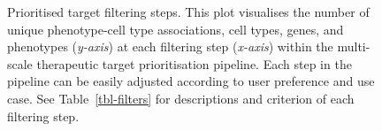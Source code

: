 \documentclass[
]{article}
\begin{document}
\newpage{}

\label{cell-fig-therapy-filter}
\begin{figure}[H]


\caption{\label{fig-therapy-filter}Prioritised target filtering steps.
This plot visualises the number of unique phenotype-cell type
associations, cell types, genes, and phenotypes (\emph{y-axis}) at each
filtering step (\emph{x-axis}) within the multi-scale therapeutic target
prioritisation pipeline. Each step in the pipeline can be easily
adjusted according to user preference and use case. See
Table~\ref{tbl-filters} for descriptions and criterion of each filtering
step.}

\end{figure}%

\newpage{}
\end{document}
